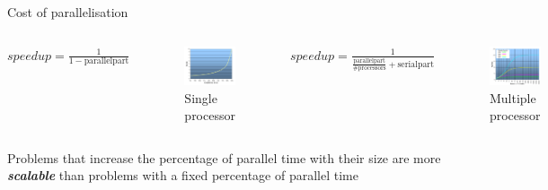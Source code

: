 \documentclass[10pt,times]{beamer}
\begin{document}
\begin{frame}{Cost of parallelisation}
\begin{columns}

$speedup = \frac{1}{1 - \mathrm{parallel part}}$
\begin{figure}
\includegraphics[width=\linewidth]{figs/amdahl1}
\caption*{Single processor}
\end{figure}
$speedup = \frac{1}{\frac{\mathrm{parallel part}}{\mathrm{\# processors}} + 
\mathrm{serial part}}$
\begin{figure}
\includegraphics[width=\linewidth]{figs/amdahl2}
\caption*{Multiple processor}
\end{figure}
\end{columns}

Problems that increase the percentage of parallel time with their size are more 
\textbf{\textit{scalable}} than problems with a fixed percentage of parallel time

\end{frame}
\end{document}

